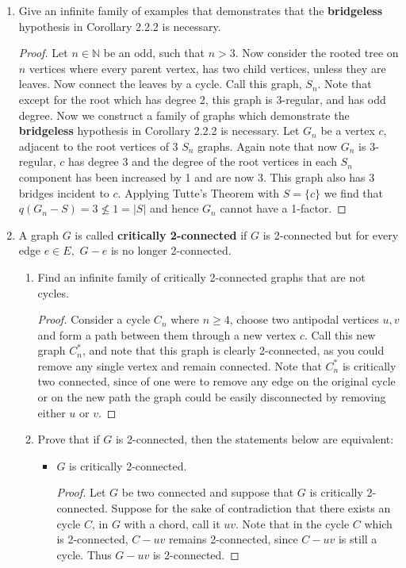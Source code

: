 \documentclass[12pt]{article}
\renewcommand{\emph}[1]{\textsf{\textbf{#1}}}
\newcommand{\NN}{\mathbb{N}}
\begin{document}
\begin{enumerate}
	
	


\item Give an infinite family of examples that demonstrates that the \emph{bridgeless} hypothesis in Corollary 2.2.2 is necessary.
\begin{proof} Let $n \in \NN$ be an odd, such that $n > 3$. Now consider the rooted tree on $n$ vertices where every parent vertex, has two child vertices, unless they are leaves. Now connect the leaves by a cycle. Call this graph, $S_n$. Note that except for the root which has degree 2, this graph is 3-regular, and has odd degree. Now we construct a family of graphs which demonstrate the \emph{bridgeless} hypothesis in Corollary 2.2.2 is necessary. Let $G_n$ be a vertex $c$, adjacent to the root vertices of 3 $S_n$ graphs. Again note that now $G_n$ is 3-regular, $c$ has degree 3 and the degree of the root vertices in each $S_n$ component has been increased by 1 and are now 3. This graph also has 3 bridges incident to $c$. Applying Tutte's Theorem with $S = \{c\}$ we find that $q(G_n - S) = 3 \not \leq 1 = |S|$ and hence $G_n$ cannot have a 1-factor.  
\end{proof}
\newpage












\item A graph $G$ is called \emph{critically 2-connected} if $G$ is 2-connected but for every edge $e \in E,$ $G-e$ is no longer 2-connected.
	\begin{enumerate}
	\item Find an infinite family of critically 2-connected graphs that are not cycles.
	\begin{proof} Consider a cycle $C_n$ where $n \geq 4$, choose two antipodal vertices $u, v$ and form a path between them through a new vertex $c$. Call this new graph $C^*_n$, and note that this graph is clearly 2-connected, as you could remove any single vertex and remain connected. Note that $C^*_n$ is critically two connected, since of one were to remove any edge on the original cycle or on the new path the graph could be easily disconnected by removing either $u$ or $v$.






	\end{proof}
	\item Prove that if $G$ is 2-connected, then the statements below are equivalent:
		\begin{itemize}
		\item $G$ is critically 2-connected.
		\begin{proof} Let $G$ be two connected and suppose that $G$ is critically 2-connected. Suppose for the sake of contradiction that there exists an cycle $C$, in $G$ with a chord, call it $uv$. Note that in the cycle $C$ which is 2-connected, $C - uv$ remains 2-connected, since $C - uv$ is still a cycle. Thus $G - uv$ is 2-connected. 
			

\end{proof}
\end{itemize}
\end{enumerate}
\end{enumerate}
\end{document}
